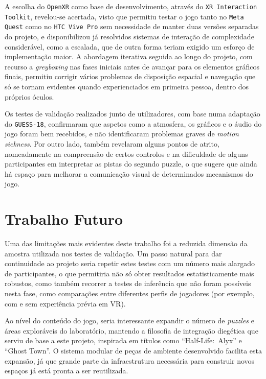 \documentclass[a4paper, 12pt]{book}
\begin{document}
A escolha do \texttt{OpenXR} como base de desenvolvimento, através do
\texttt{XR Interaction Toolkit}, revelou-se acertada, visto que permitiu testar o jogo
tanto no \texttt{Meta Quest} como no \texttt{HTC Vive Pro} sem necessidade de
manter duas versões separadas do projeto, e disponibilizou já resolvidos
sistemas de interação de complexidade considerável, como a escalada, que de
outra forma teriam exigido um esforço de implementação maior. A abordagem
iterativa seguida ao longo do projeto, com recurso a \textit{greyboxing} nas
fases iniciais antes de avançar para os elementos gráficos finais, permitiu
corrigir vários problemas de disposição espacial e navegação que só se
tornam evidentes quando experienciados em primeira pessoa, dentro dos
próprios óculos.

Os testes de validação realizados junto de utilizadores, com base numa
adaptação do \texttt{GUESS-18}, confirmaram que aspetos como a atmosfera, os
gráficos e o áudio do jogo foram bem recebidos, e não identificaram
problemas graves de \textit{motion sickness}. Por outro lado, também revelaram
alguns pontos de atrito, nomeadamente na compreensão de certos controlos e
na dificuldade de alguns participantes em interpretar as pistas do segundo
puzzle, o que sugere que ainda há espaço para melhorar a comunicação visual
de determinados mecanismos do jogo.

\section{Trabalho Futuro}
\label{sec:trabalho-futuro}

Uma das limitações mais evidentes deste trabalho foi a reduzida dimensão da
amostra utilizada nos testes de validação. Um passo natural para dar
continuidade ao projeto seria repetir estes testes com um número mais
alargado de participantes, o que permitiria não só obter resultados
estatisticamente mais robustos, como também recorrer a testes de inferência
que não foram possíveis nesta fase, como comparações entre diferentes
perfis de jogadores (por exemplo, com e sem experiência prévia em VR).

Ao nível do conteúdo do jogo, seria interessante expandir o número de
\textit{puzzles} e áreas exploráveis do laboratório, mantendo a filosofia de
integração diegética que serviu de base a este projeto, inspirada em
títulos como ``Half-Life:~Alyx'' e ``Ghost Town''. O sistema modular de
peças de ambiente desenvolvido facilita esta expansão, já que grande parte
da infraestrutura necessária para construir novos espaços já está pronta a
ser reutilizada.
\end{document}
